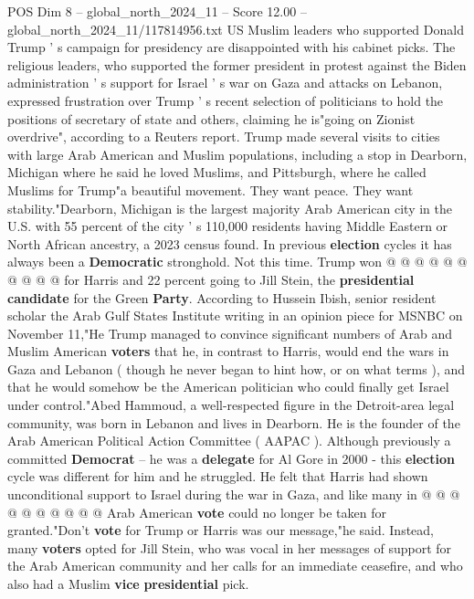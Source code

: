 \begin{textsample}{POS Dim 8 – global\_north\_2024\_11 – Score 12.00 – global\_north\_2024\_11/117814956.txt}  \label{ex:f8_pos_152}
US Muslim leaders who supported Donald Trump ' s campaign for presidency are disappointed with his cabinet picks.
The religious leaders, who supported the former president in protest against the Biden administration ' s support for Israel ' s war on Gaza and attacks on Lebanon, expressed frustration over Trump ' s recent selection of politicians to hold the positions of secretary of state and others, claiming he is"going on Zionist overdrive", according to a Reuters report.
Trump made several visits to cities with large Arab American and Muslim populations, including a stop in Dearborn, Michigan where he said he loved Muslims, and Pittsburgh, where he called Muslims for Trump"a beautiful movement.
They want peace.
They want stability."Dearborn, Michigan is the largest majority Arab American city in the U.S. with 55 percent of the city ' s 110,000 residents having Middle Eastern or North African ancestry, a 2023 census found.
In previous \textbf{election} cycles it has always been a \textbf{Democratic} stronghold.
Not this time.
Trump won @ @ @ @ @ @ @ @ @ @ for Harris and 22 percent going to Jill Stein, the \textbf{presidential} \textbf{candidate} for the Green \textbf{Party}.
According to Hussein Ibish, senior resident scholar the Arab Gulf States Institute writing in an opinion piece for MSNBC on November 11,"He Trump managed to convince significant numbers of Arab and Muslim American \textbf{voters} that he, in contrast to Harris, would end the wars in Gaza and Lebanon ( though he never began to hint how, or on what terms ), and that he would somehow be the American politician who could finally get Israel under control."Abed Hammoud, a well-respected figure in the Detroit-area legal community, was born in Lebanon and lives in Dearborn.
He is the founder of the Arab American Political Action Committee ( AAPAC ).
Although previously a committed \textbf{Democrat} -- he was a \textbf{delegate} for Al Gore in 2000 - this \textbf{election} cycle was different for him and he struggled.
He felt that Harris had shown unconditional support to Israel during the war in Gaza, and like many in @ @ @ @ @ @ @ @ @ @ Arab American \textbf{vote} could no longer be taken for granted."Don't \textbf{vote} for Trump or Harris was our message,"he said.
Instead, many \textbf{voters} opted for Jill Stein, who was vocal in her messages of support for the Arab American community and her calls for an immediate ceasefire, and who also had a Muslim \textbf{vice} \textbf{presidential} pick.

\end{textsample}
